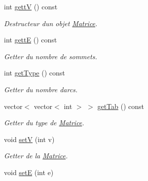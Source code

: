 \begin{DoxyCompactItemize}
\mbox{\label{classMatrice_adbedf4009a06892c5b0fc59218f5db00}} 
int \hyperlink{classMatrice_adbedf4009a06892c5b0fc59218f5db00}{gettV} () const
\begin{DoxyCompactList}\small\item\em Destructeur d\textquotesingle{}un objet \hyperlink{classMatrice}{Matrice}. \end{DoxyCompactList}\item 
\mbox{\label{classMatrice_a285e3e7a9162d035a3185e752a10b669}} 
int \hyperlink{classMatrice_a285e3e7a9162d035a3185e752a10b669}{gettE} () const
\begin{DoxyCompactList}\small\item\em Getter du nombre de sommets. \end{DoxyCompactList}\item 
\mbox{\label{classMatrice_a1b60e85fdbe9b9d8d47e4cb7e0bc5a14}} 
int \hyperlink{classMatrice_a1b60e85fdbe9b9d8d47e4cb7e0bc5a14}{get\+Type} () const
\begin{DoxyCompactList}\small\item\em Getter du nombre d\textquotesingle{}arcs. \end{DoxyCompactList}\item 
\mbox{\label{classMatrice_ad841aeb6a99b411c3e0ca4918086d03a}} 
vector$<$ vector$<$ int $>$ $>$ \hyperlink{classMatrice_ad841aeb6a99b411c3e0ca4918086d03a}{get\+Tab} () const
\begin{DoxyCompactList}\small\item\em Getter du type de \hyperlink{classMatrice}{Matrice}. \end{DoxyCompactList}\item 
\mbox{\label{classMatrice_a577cd337e049158683ba78911b4e0830}} 
void \hyperlink{classMatrice_a577cd337e049158683ba78911b4e0830}{setV} (int v)
\begin{DoxyCompactList}\small\item\em Getter de la \hyperlink{classMatrice}{Matrice}. \end{DoxyCompactList}\item 
\mbox{\label{classMatrice_a1a10f8f936477ad43ea956fd257199a1}} 
void \hyperlink{classMatrice_a1a10f8f936477ad43ea956fd257199a1}{setE} (int e)

\end{DoxyCompactItemize}
